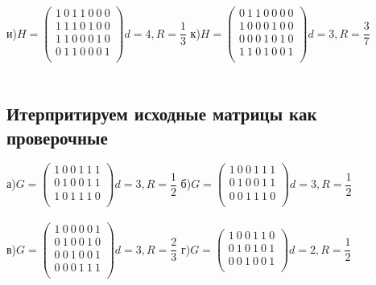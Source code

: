 \documentclass[fontsize=12pt]{article}
\begin{document}
\noindent
и)$H = \begin{pmatrix}
1\ 0\ 1\ 1\ 0\ 0\ 0\\
1\ 1\ 1\ 0\ 1\ 0\ 0\\
1\ 1\ 0\ 0\ 0\ 1\ 0\\
0\ 1\ 1\ 0\ 0\ 0\ 1\\
\end{pmatrix} d = 4, R = \dfrac{1}{3}$
{ } { } { }  { } { } { }
к)$H = \begin{pmatrix}
0\ 1\ 1\ 0\ 0\ 0\ 0\\
1\ 0\ 0\ 0\ 1\ 0\ 0\\
0\ 0\ 0\ 1\ 0\ 1\ 0\\
1\ 1\ 0\ 1\ 0\ 0\ 1\\
\end{pmatrix} d = 3, R = \dfrac{3}{7}$\\\\

\subsection*{Итерпритируем исходные матрицы как проверочные}

а)$G = \begin{pmatrix}
1\ 0\ 0\ 1\ 1\ 1\\
0\ 1\ 0\ 0\ 1\ 1\\
1\ 0\ 1\ 1\ 1\ 0\\
\end{pmatrix} d = 3, R = \dfrac{1}{2}$
{ } { } { }  { } { } { }
б)$G = \begin{pmatrix}
1\ 0\ 0\ 1\ 1\ 1\\
0\ 1\ 0\ 0\ 1\ 1\\
0\ 0\ 1\ 1\ 1\ 0\\
\end{pmatrix} d = 3, R = \dfrac{1}{2}$\\\\

\noindent
в)$G = \begin{pmatrix}
1\ 0\ 0\ 0\ 0\ 1\\
0\ 1\ 0\ 0\ 1\ 0\\
0\ 0\ 1\ 0\ 0\ 1\\
0\ 0\ 0\ 1\ 1\ 1\\
\end{pmatrix} d = 3, R = \dfrac{2}{3}$
{ } { } { }  { } { } { }
г)$G = \begin{pmatrix}
1\ 0\ 0\ 1\ 1\ 0\\
0\ 1\ 0\ 1\ 0\ 1\\
0\ 0\ 1\ 0\ 0\ 1\\
\end{pmatrix} d = 2, R = \dfrac{1}{2}$\\\\
\end{document}
